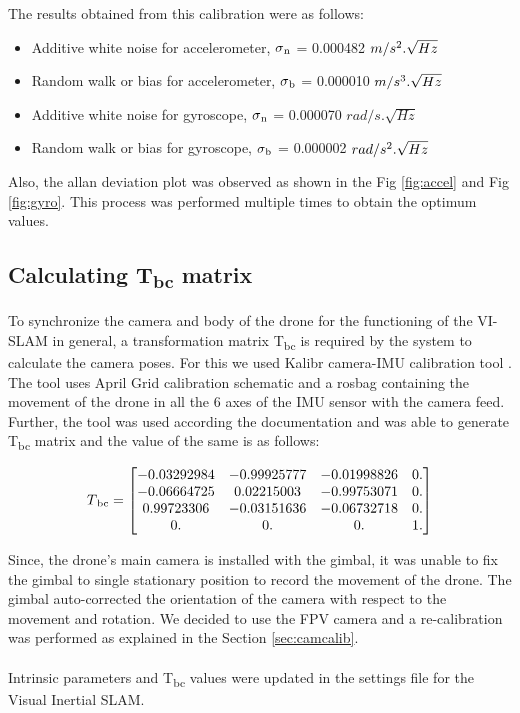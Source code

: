 The results obtained from this calibration were as follows:

\begin{itemize}
    \item Additive white noise for accelerometer, $\sigma\textsubscript{n}$ = 0.000482 $m/s\textsuperscript{2} . \sqrt{Hz}$
    \item Random walk or bias for accelerometer,  $\sigma\textsubscript{b}$ = 0.000010 $m/s\textsuperscript{3} . \sqrt{Hz}$
    \item Additive white noise for gyroscope, $\sigma\textsubscript{n}$ = 0.000070 $rad/s . \sqrt{Hz}$
    \item Random walk or bias for gyroscope,  $\sigma\textsubscript{b}$ = 0.000002 $rad/s\textsuperscript{2} . \sqrt{Hz}$
\end{itemize}

Also, the allan deviation plot was observed as shown in the Fig \ref{fig:accel} and Fig \ref{fig:gyro}. This process was performed multiple times to obtain the optimum values.

\subsection*{Calculating T\textsubscript{bc} matrix}
To synchronize the camera and body of the drone for the functioning of the VI-SLAM in general, a transformation matrix T\textsubscript{bc} is required by the system to calculate the camera poses. For this we used Kalibr camera-IMU calibration tool \cite{Kalibr}. The tool uses April Grid calibration schematic and a rosbag containing the movement of the drone in all the 6 axes of the IMU sensor with the camera feed. Further, the tool was used according the documentation and was able to generate T\textsubscript{bc} matrix and the value of the same is as follows:

\begin{align}
   T\textsubscript{bc} =
   \begin{bmatrix}
   -0.03292984 & -0.99925777 & -0.01998826 & 0.\\
  -0.06664725 & 0.02215003 & -0.99753071 & 0.\\
   0.99723306 & -0.03151636 & -0.06732718 & 0.\\
   0.     &     0.     &     0.     &     1.
   \end{bmatrix}
\end{align}

Since, the drone's main camera is installed with the gimbal, it was unable to fix the gimbal to single stationary position to record the movement of the drone. The gimbal auto-corrected the orientation of the camera with respect to the movement and rotation. We decided to use the FPV camera and a re-calibration was performed as explained in the Section \ref{sec:camcalib}.\\
\\
Intrinsic parameters and T\textsubscript{bc} values were updated in the settings file for the Visual Inertial SLAM. 

